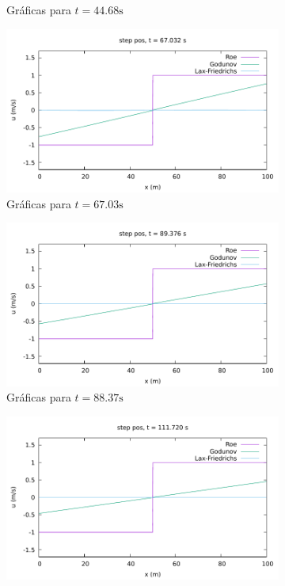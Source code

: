 \documentclass[12pt]{article}
\begin{document}
\begin{figure}[h!]
\begin{subfigure}{0.49\textwidth}
			\caption*{Gráficas para $t=44.68\unit{\second}$}
			\label{fig:step_pos-perio3}
		\end{subfigure}\hfill
		\begin{subfigure}{0.49\textwidth}
			\centering
			\includegraphics[width=\textwidth]{../burgers1DVF/results/sol_periodicas/step_pos/063.pdf}
			\caption*{Gráficas para $t=67.03\unit{\second}$}
			\label{fig:step_pos-perio4}
		\end{subfigure}\par
		\begin{subfigure}{0.49\textwidth}
			\centering
			\includegraphics[width=\textwidth]{../burgers1DVF/results/sol_periodicas/step_pos/084.pdf}
			\caption*{Gráficas para $t=88.37\unit{\second}$}
			\label{fig:step_pos-perio5}
		\end{subfigure}\hfill
		\begin{subfigure}{0.49\textwidth}
			\centering
			\includegraphics[width=\textwidth]{../burgers1DVF/results/sol_periodicas/step_pos/105.pdf}

\end{subfigure}
\end{figure}
\end{document}
